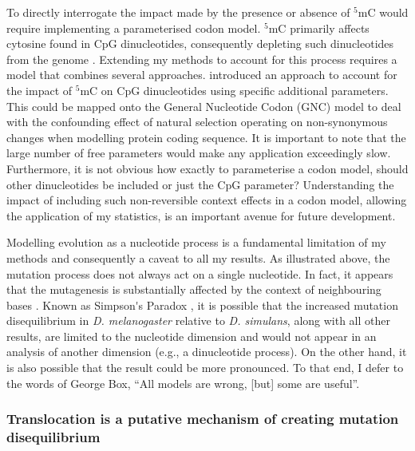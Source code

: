 To directly interrogate the impact made by the presence or absence of $^5$mC would require implementing a parameterised codon model. $^5$mC primarily affects cytosine found in CpG dinucleotides, consequently depleting such dinucleotides from the genome \citep{Holliday1975DNADevelopment, Bird1980DNADNA}. Extending my methods to account for this process requires a model that combines several approaches. \cite{Huttley2004ModelingMammals} introduced an approach to account for the impact of $^5$mC on CpG dinucleotides using specific additional parameters. This could be mapped onto the General Nucleotide Codon (GNC) model \citep{Kaehler2017StandardData} to deal with the confounding effect of natural selection operating on non-synonymous changes when modelling protein coding sequence. It is important to note that the large number of free parameters would make any application exceedingly slow. Furthermore, it is not obvious how exactly to parameterise a codon model, should other dinucleotides be included or just the CpG parameter? Understanding the impact of including such non-reversible context effects in a codon model, allowing the application of my statistics, is an important avenue for future development. 

Modelling evolution as a nucleotide process is a fundamental limitation of my methods and consequently a caveat to all my results. As illustrated above, the mutation process does not always act on a single nucleotide. In fact, it appears that the mutagenesis is substantially affected by the context of neighbouring bases \citep{Zhu2020MachineMutations}. Known as \gls{Simpson's Paradox} \citep{Simpson1951TheTables}, it is possible that the increased mutation disequilibrium in \textit{D. melanogaster} relative to \textit{D. simulans}, along with all other results, are limited to the nucleotide dimension and would not appear in an analysis of another dimension (e.g., a  dinucleotide process). On the other hand, it is also possible that the result could be more pronounced. To that end, I defer to the words of George Box, ``All models are wrong, [but] some are useful''. 

\subsubsection{Translocation is a putative mechanism of creating mutation disequilibrium}

